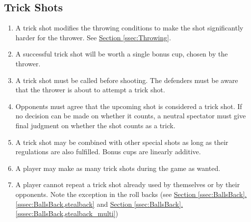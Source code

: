 	\subsection{Trick Shots}\label{ssec:TrickShots}
        \begin{enumerate}[label=(\roman*)]
            \item \label{sssec:trickShots,deff} A trick shot modifies the throwing conditions to make the shot significantly harder for the thrower.
                See \hyperref[ssec:Throwing]{Section \ref{ssec:Throwing}}.
            \item \label{sssec:TrickShots,numofcups} A successful trick shot will be worth a single bonus cup, chosen by the thrower.
            \item \label{sssec:TrickShots,calling} A trick shot must be called before shooting.
                The defenders must be aware that the thrower is about to attempt a trick shot.
            \item \label{sssec:TrickShot,agree} Opponents must agree that the upcoming shot is considered a trick shot.
                If no decision can be made on whether it counts, a neutral spectator must give final judgment on whether the shot counts as a trick.
            \item \label{sssec:TrickShot,combo} A trick shot may be combined with other special shots as long as their regulations are also fulfilled.
                Bonus cups are linearly additive. 
            \item \label{sssec:TrickShot,number} A player may make as many trick shots during the game as wanted.
            \item \label{sssec:TrickShot,repeat} A player cannot repeat a trick shot already used by themselves or by their opponents.
                Note the exception in the roll backs (see \hyperref[sssec:BallsBack,stealback]{Section \ref{ssec:BallsBack}.\ref{sssec:BallsBack,stealback}} and \hyperref[sssec:BallsBack,stealback_multi]{Section \ref{ssec:BallsBack}.\ref{sssec:BallsBack,stealback_multi}})
        \end{enumerate}
